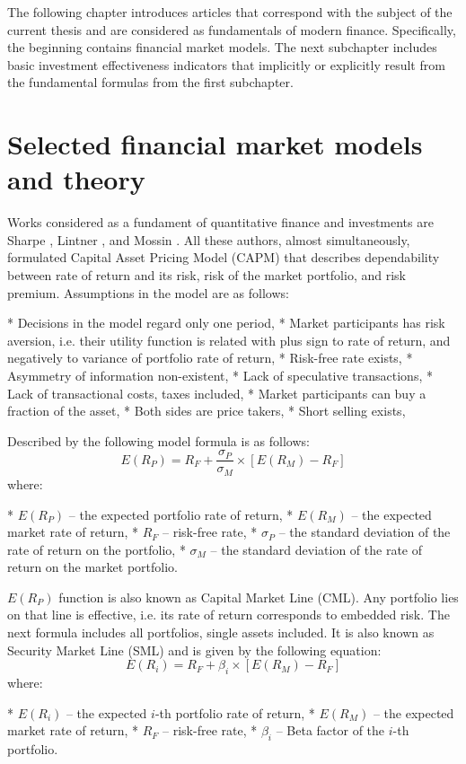 \documentclass{article}\usepackage[]{graphicx}\usepackage[]{color}
\begin{document}
The following chapter introduces articles that correspond with the subject of the current thesis and are considered as fundamentals of modern finance.
Specifically, the beginning contains financial market models. The next subchapter includes basic investment effectiveness indicators that implicitly or explicitly result from the fundamental formulas from the first subchapter.

\section{Selected financial market models and theory}


Works considered as a fundament of quantitative finance and investments are Sharpe \cite{Sharpe1964}, Lintner \cite{Lintner1965}, and Mossin \cite{Mossin1966}. All these authors, almost simultaneously, formulated Capital Asset Pricing Model (CAPM) that describes dependability between rate of return and its risk, risk of the market portfolio, and risk premium.
Assumptions in the model are as follows:

* Decisions in the model regard only one period,
* Market participants has risk aversion, i.e. their utility function is related with plus sign to rate of return, and negatively to variance of portfolio rate of return,
* Risk-free rate exists,
* Asymmetry of information non-existent,
* Lack of speculative transactions,
* Lack of transactional costs, taxes included,
* Market participants can buy a fraction of the asset,
* Both sides are price takers,
* Short selling exists,

Described by the following model formula is as follows:
$$
E(R_P)=R_F+\frac{\sigma_P}{\sigma_M}\times[E(R_M)-R_F]
$$
where:

* $E(R_P )$ -- the expected portfolio rate of return,
* $E(R_M)$ -- the expected market rate of return,
* $R_F$ -- risk-free rate,
* $\sigma_P$ -- the standard deviation of the rate of return on the portfolio,
* $\sigma_M$ -- the standard deviation of the rate of return on the market portfolio.

$E(R_P)$ function is also known as Capital Market Line (CML). Any portfolio lies on that line is effective, i.e. its rate of return corresponds to embedded risk.
The next formula includes all portfolios, single assets included. It is also known as Security Market Line (SML) and is given by the following equation:
$$ \label{eq:erl}
E(R_i)=R_F+\beta_i\times[E(R_M)-R_F]
$$
where:

* $E(R_i)$ -- the expected $i$-th portfolio rate of return,
* $E(R_M)$ -- the expected market rate of return,
* $R_F$ -- risk-free rate,
* $\beta_i$ -- Beta factor of the $i$-th portfolio.
\end{document}
